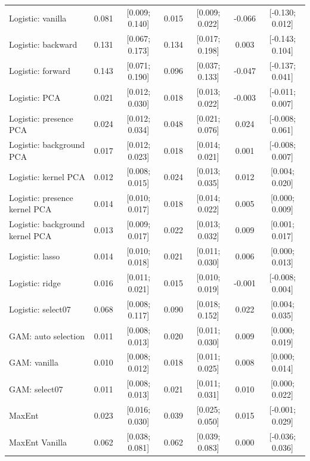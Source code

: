 \begin{table}[!htb]
{\begin{tabular}{lcccccc}
\midrule
Logistic: vanilla                 & 0.081 &  [0.009; 0.140] & 0.015  & [0.009; 0.022] & -0.066 &  [-0.130; 0.012]   \\ 
Logistic: backward                & 0.131 &  [0.067; 0.173] & 0.134  & [0.017; 0.198] & 0.003  &  [-0.143; 0.104]   \\
Logistic: forward                 & 0.143 &  [0.071; 0.190] & 0.096  & [0.037; 0.133] & -0.047 &  [-0.137; 0.041]   \\
Logistic: PCA                     & 0.021 &  [0.012; 0.030] & 0.018  & [0.013; 0.022] & -0.003 &  [-0.011; 0.007]   \\
Logistic: presence PCA            & 0.024 &  [0.012; 0.034] & 0.048  & [0.021; 0.076] & 0.024  &  [-0.008; 0.061]   \\
Logistic: background PCA          & 0.017 &  [0.012; 0.023] & 0.018  & [0.014; 0.021] & 0.001  &  [-0.008; 0.007]   \\ 
Logistic: kernel PCA              & 0.012 &  [0.008; 0.015] & 0.024  & [0.013; 0.035] & 0.012  &  [0.004; 0.020]   \\ 
Logistic: presence kernel PCA     & 0.014 &  [0.010; 0.017] & 0.018  & [0.014; 0.022] & 0.005  &  [0.000; 0.009]   \\ 
Logistic: background kernel PCA   & 0.013 &  [0.009; 0.017] & 0.022  & [0.013; 0.032] & 0.009  &  [0.001; 0.017]   \\ 
Logistic: lasso                   & 0.014 &  [0.010; 0.018] & 0.021  & [0.011; 0.030] & 0.006  &  [0.000; 0.013]   \\ 
Logistic: ridge                   & 0.016 &  [0.011; 0.021] & 0.015  & [0.010; 0.019] & -0.001 &  [-0.008; 0.004]   \\ 
Logistic: select07                & 0.068 &  [0.008; 0.117] & 0.090  & [0.018; 0.152] & 0.022  &  [0.004; 0.035]   \\ 
GAM: auto selection               & 0.011 &  [0.008; 0.013] & 0.020  & [0.011; 0.030] & 0.009  &  [0.000; 0.019]   \\ 
GAM: vanilla                      & 0.010 &  [0.008; 0.012] & 0.018  & [0.011; 0.025] & 0.008  &  [0.000; 0.014]   \\ 
GAM: select07                     & 0.011 &  [0.008; 0.013] & 0.021  & [0.011; 0.031] & 0.010  &  [0.000; 0.022]   \\ 
MaxEnt                            & 0.023 &  [0.016; 0.030] & 0.039  & [0.025; 0.050] & 0.015  &  [-0.001; 0.029]   \\
MaxEnt Vanilla                    & 0.062 &  [0.038; 0.081] & 0.062  & [0.039; 0.083] & 0.000  &  [-0.036; 0.036]   \\

\end{tabular}}
\end{table}
